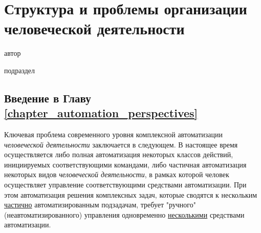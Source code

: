 \chapter{Структура и проблемы организации человеческой деятельности}
\label{chapter_automation_perspectives}

\vspace{-7\baselineskip}

\begin{SCn}
\begin{scnrelfromlist}{автор}
\end{scnrelfromlist}

\bigskip


\bigskip

\begin{scnrelfromlist}{подраздел}
\end{scnrelfromlist}

\end{SCn}

\section*{Введение в Главу \ref{chapter_automation_perspectives}}

Ключевая проблема современного уровня комплексной автоматизации \textit{человеческой деятельности} заключается в следующем. В настоящее время осуществляется либо полная автоматизация некоторых классов действий, инициируемых соответствующими командами, либо частичная автоматизация некоторых видов \textit{человеческой деятельности}, в рамках которой человек осуществляет управление соответствующими средствами автоматизации. При этом автоматизация решения комплексных задач, которые сводятся к нескольким \underline{частично} автоматизированным подзадачам, требует "ручного"{} (неавтоматизированного) управления одновременно \underline{несколькими} средствами автоматизации.

